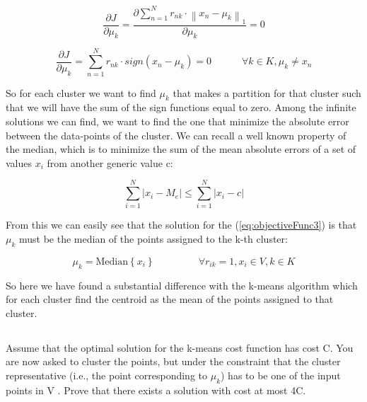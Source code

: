 \documentclass{article}
\newcommand{\norm}[1]{\left\lVert#1\right\rVert}
\begin{document}
\begin{equation} \label{eq:derivative1Func3}
\frac {\partial J} {\partial \mu_{k}}	=	\frac {\partial \sum_{n=1}^{N} r_{nk} \cdot \norm { x_{n} - \mu_{k} }_{1}} {\partial \mu_{k}}		= 0
\end{equation}

\begin{equation} \label{eq:derivative2Func3}
\frac {\partial J} {\partial \mu_{k}}	=		\sum_{n=1}^{N} {r_{nk} \cdot sign(x_{n} - \mu_{k})} 	= 0		\;\;\;\;\;\;\;\;\;\;\;      \forall k \in K, \mu_{k} \neq x_{n}
\end{equation}

So for each cluster we want to find $\mu_{k}$ that makes a partition for that cluster such that we will have the sum of the sign functions equal to zero.
Among the infinite solutions we can find, we want to find the one that minimize the absolute error between the data-points of the cluster.
We can recall a well known property of the median, which is to minimize the sum of the mean absolute errors of a set of values $x_{i}$ from another generic value c:

\begin{equation} \label{eq:medianProperty}
\sum_{i=1}^{N} | x_{i} - M_{e} | 	\le	\sum_{i=1}^{N} | x_{i} - c |
\end{equation}

From this we can easily see that the solution for the (\ref{eq:objectiveFunc3}) is that $\mu_{k}$ must be the median of the points assigned to the k-th cluster:

\begin{equation} \label{eq:mukMedian}
\mu_{k} = \text{Median} \left\{ x_{i}  \right\}			\;\;\;\;\;\;\;\;\;\;\;\;\;\;\;\;			\forall r_{ik} = 1, x_{i} \in V, k \in K
\end{equation}


So here we have found a substantial difference with the k-means algorithm which for each cluster find the centroid as the mean of the points assigned to that cluster.



\subsection{}
Assume that the optimal solution for the k-means cost function has cost C. You are now asked to cluster the points, but under the constraint that the cluster representative (i.e., the point corresponding to $\mu_{k}$) has to be one of the input points in V . Prove that there exists a solution with cost at most 4C. \par
\end{document}
